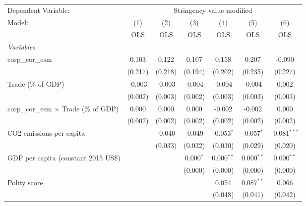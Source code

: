 
\begingroup
\centering
\begin{tabular}{lcccccc}
   \toprule
   Dependent Variable: & \multicolumn{6}{c}{Stringency value modified}\\
   Model:                                        & (1)     & (2)     & (3)         & (4)          & (5)          & (6)\\  
                                                 &  OLS    & OLS     & OLS         & OLS          & OLS          & OLS\\  
   \midrule
   \emph{Variables}\\
   corp\_cor\_esm                                & 0.103   & 0.122   & 0.107       & 0.158        & 0.207        & -0.090\\   
                                                 & (0.217) & (0.218) & (0.194)     & (0.202)      & (0.235)      & (0.227)\\   
   Trade (\% of GDP)                             & -0.003  & -0.003  & -0.004      & -0.004       & -0.004       & 0.002\\   
                                                 & (0.002) & (0.003) & (0.002)     & (0.003)      & (0.003)      & (0.003)\\   
   corp\_cor\_esm $\times$ Trade (\% of GDP)     & 0.000   & 0.000   & 0.000       & -0.002       & -0.002       & 0.000\\   
                                                 & (0.002) & (0.002) & (0.002)     & (0.002)      & (0.002)      & (0.002)\\   
   CO2 emissions per capita                      &         & -0.040  & -0.049      & -0.053$^{*}$ & -0.057$^{*}$ & -0.081$^{***}$\\   
                                                 &         & (0.033) & (0.032)     & (0.030)      & (0.029)      & (0.020)\\   
   GDP per capita (constant 2015 US\$)           &         &         & 0.000$^{*}$ & 0.000$^{**}$ & 0.000$^{**}$ & 0.000$^{**}$\\   
                                                 &         &         & (0.000)     & (0.000)      & (0.000)      & (0.000)\\   
   Polity score                                  &         &         &             & 0.054        & 0.087$^{**}$ & 0.066\\   
                                                 &         &         &             & (0.048)      & (0.041)      & (0.042)\\   

\end{tabular}
